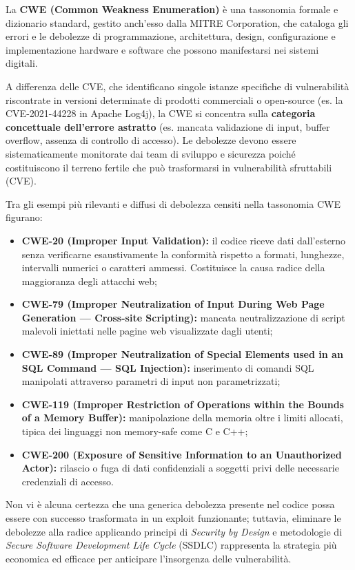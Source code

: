 \documentclass[../../main.tex]{subfiles}
\begin{document}
La \textbf{CWE (Common Weakness Enumeration)} è una tassonomia formale e dizionario standard, gestito anch'esso dalla MITRE Corporation, che cataloga gli errori e le debolezze di programmazione, architettura, design, configurazione e implementazione hardware e software che possono manifestarsi nei sistemi digitali.

A differenza delle CVE, che identificano singole istanze specifiche di vulnerabilità riscontrate in versioni determinate di prodotti commerciali o open-source (es. la CVE-2021-44228 in Apache Log4j), la CWE si concentra sulla \textbf{categoria concettuale dell'errore astratto} (es. mancata validazione di input, buffer overflow, assenza di controllo di accesso). Le debolezze devono essere sistematicamente monitorate dai team di sviluppo e sicurezza poiché costituiscono il terreno fertile che può trasformarsi in vulnerabilità sfruttabili (CVE). 

Tra gli esempi più rilevanti e diffusi di debolezza censiti nella tassonomia CWE figurano:
\begin{itemize}
    \item \textbf{CWE-20 (Improper Input Validation):} il codice riceve dati dall'esterno senza verificarne esaustivamente la conformità rispetto a formati, lunghezze, intervalli numerici o caratteri ammessi. Costituisce la causa radice della maggioranza degli attacchi web;
    \item \textbf{CWE-79 (Improper Neutralization of Input During Web Page Generation --- Cross-site Scripting):} mancata neutralizzazione di script malevoli iniettati nelle pagine web visualizzate dagli utenti;
    \item \textbf{CWE-89 (Improper Neutralization of Special Elements used in an SQL Command --- SQL Injection):} inserimento di comandi SQL manipolati attraverso parametri di input non parametrizzati;
    \item \textbf{CWE-119 (Improper Restriction of Operations within the Bounds of a Memory Buffer):} manipolazione della memoria oltre i limiti allocati, tipica dei linguaggi non memory-safe come C e C++;
    \item \textbf{CWE-200 (Exposure of Sensitive Information to an Unauthorized Actor):} rilascio o fuga di dati confidenziali a soggetti privi delle necessarie credenziali di accesso.
\end{itemize}

Non vi è alcuna certezza che una generica debolezza presente nel codice possa essere con successo trasformata in un exploit funzionante; tuttavia, eliminare le debolezze alla radice applicando principi di \textit{Security by Design} e metodologie di \textit{Secure Software Development Life Cycle} (SSDLC) rappresenta la strategia più economica ed efficace per anticipare l'insorgenza delle vulnerabilità.
\end{document}

